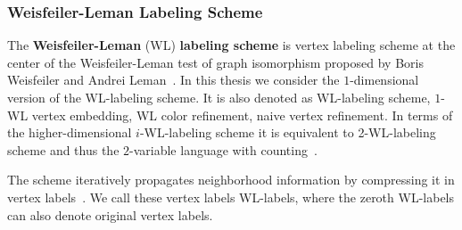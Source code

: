 	\subsubsection{Weisfeiler-Leman Labeling Scheme} \label{subsubsec:def_WLlabeling}%
		The \textbf{Weisfeiler-Leman} (WL) \textbf{labeling scheme} is vertex labeling scheme at the center of the Weisfeiler-Leman test of graph isomorphism proposed by Boris Weisfeiler and Andrei Leman~\cite{1968_Weisfeiler_CONF}.
		In this thesis we consider the $1$-dimensional version of the WL-labeling scheme. 
		It is also denoted as WL-labeling scheme, $1$-WL vertex embedding, WL color refinement, naive vertex refinement.
		In terms of the higher-dimensional $i$-WL-labeling scheme it is equivalent to 2-WL-labeling scheme and thus the $2$-variable language with counting~\cite{2011_Shervashidze_JMLR, 2019_Xu_CONF, 1992_Cai_IEEE}. 
				
		The scheme iteratively propagates neighborhood information by compressing it in vertex labels~\cite{1968_Weisfeiler_CONF}.
		We call these vertex labels WL-labels, where the zeroth WL-labels can also denote original vertex labels.
		
